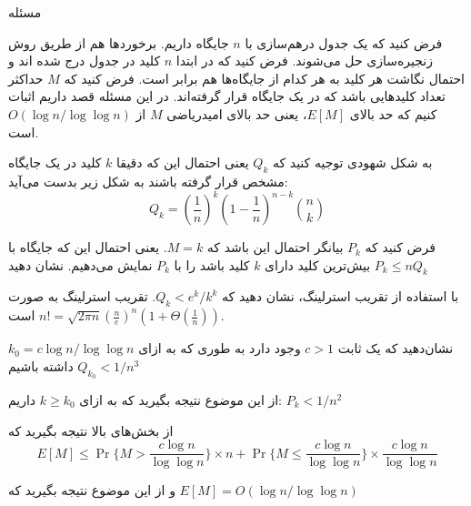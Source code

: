 ‌مسئله

فرض کنید که یک جدول درهم‌سازی با $n$ جایگاه
داریم. برخورد‌ها هم از طریق روش زنجیره‌سازی حل می‌شوند. فرض کنید که در ابتدا $n$ کلید در جدول درج شده اند و احتمال نگاشت هر کلید به هر کدام از جایگاه‌ها هم برابر است. فرض کنید که $M$ حداکثر تعداد کلید‌هایی باشد که در یک جایگاه قرار گرفته‌اند. در این مسئله قصد داریم اثبات کنیم که حد بالای $E[M]$، یعنی حد بالای امیدریاضی $M$ از 
$O(\log n / \log \log n)$
است.

 
 به شکل شهودی توجیه کنید که $Q_k$ یعنی احتمال این که دقیقا $k$ کلید در یک جایگاه مشخص قرار گرفته باشند به شکل زیر بدست می‌آید:
 $$Q_k = (\frac{1}{n})^k (1-\frac{1}{n})^{n-k}\binom{n}{k}$$
 
 فرض کنید که $P_k$ بیانگر احتمال این باشد که $M=k$. یعنی احتمال این که جایگاه با بیش‌ترین کلید دارای $k$ کلید باشد را با $P_k$ نمایش می‌دهیم. نشان دهید $P_k \leq n Q_k$
 
 با استفاده از تقریب استرلینگ، نشان دهید که $Q_k < e^k / k^k$. تقریب استرلینگ به صورت
 $n! = \sqrt{2 \pi n} (\frac{n}{e})^n (1 + \Theta(\frac{1}{n}))$
 است.
 
 نشان‌دهید که یک ثابت $c>1$ وجود دارد به طوری که به ازای
 $k_0 = c \log n / \log \log n$
 داشته باشیم
 $Q_{k_0} < 1/n^3$
 
 از این موضوع نتیجه بگیرید که به ازای $k \geq k_0$ داریم: $P_k < 1/n^2$
 
 از بخش‌های بالا نتیجه بگیرید که
 $$E[M] \leq \operatorname{Pr}\{M > \frac{c \log n}{\log \log n}\} \times n + \operatorname{Pr}\{M \leq \frac{c \log n}{\log \log n} \} \times \frac{c \log n}{\log \log n}$$
 
 و از این موضوع نتیجه بگیرید که
 $E[M] = O(\log n / \log \log n)$


